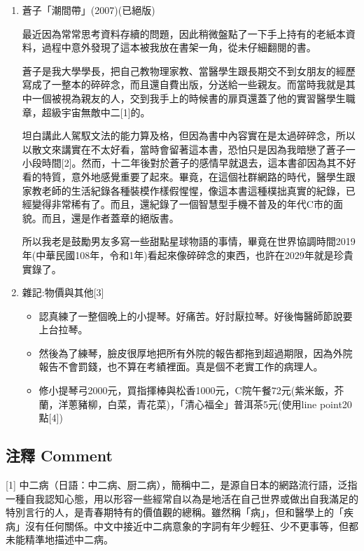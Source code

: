 \documentclass[a5paper, 12pt
]{book}
\providecommand{\tightlist}{%
  \setlength{\itemsep}{0pt}\setlength{\parskip}{0pt}}
\begin{document}
\begin{enumerate}
\def\labelenumi{\arabic{enumi}.}
\item
  蒼子「潮間帶」(2007)(已絕版)

  最近因為常常思考資料存續的問題，因此稍微盤點了一下手上持有的老紙本資料，過程中意外發現了這本被我放在書架一角，從未仔細翻閱的書。

  蒼子是我大學學長，把自己教物理家教、當醫學生跟長期交不到女朋友的經歷寫成了一整本的碎碎念，而且還自費出版，分送給一些親友。而當時我就是其中一個被視為親友的人，交到我手上的時候書的扉頁還蓋了他的實習醫學生職章，超級宇宙無敵中二{[}1{]}的。

  坦白講此人駕馭文法的能力算及格，但因為書中內容實在是太過碎碎念，所以以散文來講實在不太好看，當時會留著這本書，恐怕只是因為我暗戀了蒼子一小段時間{[}2{]}。然而，十二年後對於蒼子的感情早就退去，這本書卻因為其不好看的特質，意外地感覺重要了起來。畢竟，在這個社群網路的時代，醫學生跟家教老師的生活紀錄各種裝模作樣假惺惺，像這本書這種樸拙真實的紀錄，已經變得非常稀有了。而且，還紀錄了一個智慧型手機不普及的年代C市的面貌。而且，還是作者蓋章的絕版書。

  所以我老是鼓勵男友多寫一些甜點星球物語的事情，畢竟在世界協調時間2019年(中華民國108年，令和1年)看起來像碎碎念的東西，也許在2029年就是珍貴實錄了。
\item
  雜記:物價與其他{[}3{]}

  \begin{itemize}
  \tightlist
  \item
    認真練了一整個晚上的小提琴。好痛苦。好討厭拉琴。好後悔醫師節說要上台拉琴。
  \item
    然後為了練琴，臉皮很厚地把所有外院的報告都拖到超過期限，因為外院報告不會罰錢，也不算在考績裡面。真是個不老實工作的病理人。
  \item
    修小提琴弓2000元，買指揮棒與松香1000元，C院午餐72元(紫米飯，芥蘭，洋蔥豬柳，白菜，青花菜)，「清心福全」普洱茶5元(使用line
    point20點{[}4{]})
  \end{itemize}
\end{enumerate}

\hypertarget{ux6ce8ux91cb-comment-30}{%
\subsection{注釋 Comment}\label{ux6ce8ux91cb-comment-30}}

{[}1{]}
中二病（日語：中二病、厨二病），簡稱中二，是源自日本的網路流行語，泛指一種自我認知心態，用以形容一些經常自以為是地活在自己世界或做出自我滿足的特別言行的人，是青春期特有的價值觀的總稱。雖然稱「病」，但和醫學上的「疾病」沒有任何關係。中文中接近中二病意象的字詞有年少輕狂、少不更事等，但都未能精準地描述中二病。
\end{document}
